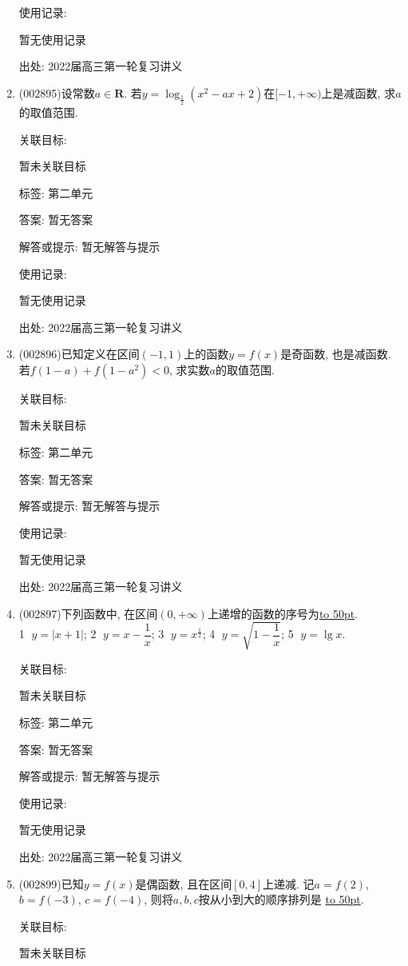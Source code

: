 \documentclass[10pt,a4paper]{article}
\newcommand{\blank}[1]{\underline{\hbox to #1pt{}}}
\begin{document}
\begin{enumerate}[1.]
使用记录:

暂无使用记录


出处: 2022届高三第一轮复习讲义
\item { (002895)}设常数$a\in \mathbf{R}$. 若$y=\log_{\frac 12}(x^2-ax+2)$在$[-1,+\infty)$上是减函数, 求$a$的取值范围.


关联目标:

暂未关联目标



标签: 第二单元

答案: 暂无答案

解答或提示: 暂无解答与提示

使用记录:

暂无使用记录


出处: 2022届高三第一轮复习讲义
\item { (002896)}已知定义在区间$(-1,1)$上的函数$y=f(x)$是奇函数, 也是减函数. 若$f(1-a)+f(1-a^2)<0$, 求实数$a$的取值范围.


关联目标:

暂未关联目标



标签: 第二单元

答案: 暂无答案

解答或提示: 暂无解答与提示

使用记录:

暂无使用记录


出处: 2022届高三第一轮复习讲义
\item { (002897)}下列函数中, 在区间$(0 ,+\infty)$上递增的函数的序号为\blank{50}.\\
\textcircled{1} $y=|x+1|$;  \textcircled{2} $y=x-\dfrac 1x$;    \textcircled{3} $y={x^{\frac 12}}$;    \textcircled{4} $y=\sqrt{1-\dfrac 1x}$; \textcircled{5} $y=\lg x$.


关联目标:

暂未关联目标



标签: 第二单元

答案: 暂无答案

解答或提示: 暂无解答与提示

使用记录:

暂无使用记录


出处: 2022届高三第一轮复习讲义
\item { (002899)}已知$y=f(x)$是偶函数, 且在区间$[0,4]$上递减. 记$a=f(2)$, $b=f(-3)$, $c=f(-4)$, 则将$a,b,c$按从小到大的顺序排列是	\blank{50}.


关联目标:

暂未关联目标




\end{enumerate}
\end{document}
